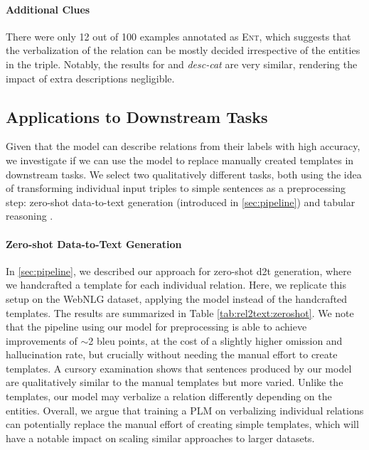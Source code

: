 \paragraph{Additional Clues} There were only 12 out of 100 examples annotated as \textsc{Ent}, which suggests that the verbalization of the relation can be mostly decided irrespective of the entities in the triple. Notably, the results for \BARTr{} and \textit{desc-cat} are very similar, rendering the impact of extra descriptions negligible.


\subsection{Applications to Downstream Tasks}
\label{sec:rel2text:downstream}
Given that the \BARTr{} model can describe relations from their labels with high accuracy, we investigate if we can use the model to replace manually created templates in downstream tasks. We select two qualitatively different tasks, both using the idea of transforming individual input triples to simple sentences as a preprocessing step: zero-shot data-to-text generation (introduced in \autoref{sec:pipeline}) and tabular reasoning \cite{gupta2020infotabs,neeraja2021incorporating}.






\paragraph{Zero-shot Data-to-Text Generation} In \autoref{sec:pipeline}, we described our approach for zero-shot \ac{d2t} generation, where we handcrafted a template for each individual relation. Here, we replicate this setup on the WebNLG dataset, applying the \BARTr{} model instead of the handcrafted templates. The results are summarized in Table \ref{tab:rel2text:zeroshot}.  We note that the pipeline using our model for preprocessing is able to achieve improvements of $\sim$2 \acs{bleu} points, at the cost of a slightly higher omission and hallucination rate, but crucially without needing the manual effort to create templates. A cursory examination shows that sentences produced by our model are qualitatively similar to the manual templates but more varied. Unlike the templates, our model may verbalize a relation differently depending on the entities.
Overall, we argue that training a PLM on verbalizing individual relations can potentially replace the manual effort of creating simple templates, which will have a notable impact on scaling similar approaches to larger datasets.

